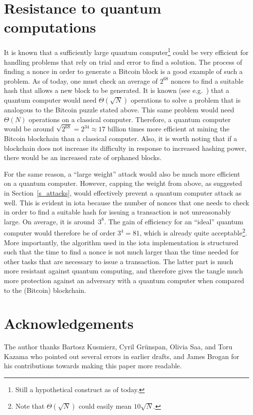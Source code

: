 \documentclass[12pt]{article}
\begin{document}
\begin{CJK}{UTF8}{bkai}
\section{Resistance to quantum computations}
\label{s_quantum}
It is known that a sufficiently large
 quantum computer\footnote{Still a hypothetical construct as of today.}
  could be very efficient for handling problems
that rely on trial and error to find a solution. The process of finding a nonce
in order to generate a Bitcoin block is a good example 
of such a problem. As of today, one must 
check an average of $2^{68}$ nonces to find a suitable hash
that allows a new block to be generated. 
 It is known (see e.g.~\cite{BHT}) that a quantum computer would need 
$\Theta(\sqrt{N})$ operations to solve a problem that is analogous to 
the Bitcoin puzzle stated above. This same problem would need
~$\Theta(N)$ operations on a classical computer.
Therefore, a quantum computer would be 
around $\sqrt{2^{68}}=2^{34}\approx 17$ billion times
more efficient at mining the Bitcoin blockchain than a classical computer.
Also, it is worth noting that
 if a blockchain does not increase its difficulty in response 
to increased hashing power, there would be an 
increased rate of orphaned blocks.

For the same reason, a ``large weight'' attack would also be much more 
efficient on a quantum computer.
However, capping the weight from above, as suggested
in Section~\ref{s_attacks}, would effectively prevent
a quantum computer attack as well. This is evident in iota because 
the number of nonces that one needs to check in order
to find a suitable hash for issuing a transaction is not 
unreasonably large. On average, it is around~$3^8$. 
The gain of efficiency for 
an ``ideal'' quantum computer would therefore
be of order $3^{4}=81$, which is already quite 
acceptable\footnote{Note that $\Theta(\sqrt{N})$
could easily mean $10\sqrt{N}$.}.
More importantly, the algorithm used in the iota implementation 
is structured such that the time to find a nonce is 
not much larger than the time needed for other tasks that 
are necessary to issue a transaction. The latter part is much
 more resistant against quantum computing, and therefore 
 gives the tangle much more protection against an adversary with a 
 quantum computer when compared to the (Bitcoin) blockchain.



\section*{Acknowledgements}
The author thanks  Bartosz Kusmierz, Cyril Gr\"unspan,
Olivia Saa, and
 Toru Kazama who pointed
out several errors in earlier drafts, and James Brogan
for his contributions towards making this paper more readable.




\end{CJK}
\end{document}
